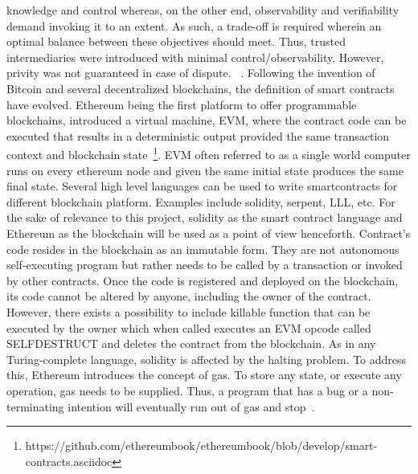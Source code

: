 knowledge and control whereas, on the other end, observability and
verifiability demand invoking it to an extent. As such, a trade-off is
required wherein an optimal balance between these objectives should meet. Thus,
trusted intermediaries were introduced with minimal control/observability.
However, privity was not guaranteed in case of dispute. 
~\cite{szabo1997formalizing}.
Following the invention of Bitcoin and several decentralized blockchains, the
definition of smart contracts have evolved. Ethereum being the first platform
to offer programmable blockchains, introduced a virtual machine, EVM, where the
contract code can be executed that results in a deterministic output provided
the same transaction context and blockchain
state~\footnote{https://github.com/ethereumbook/ethereumbook/blob/develop/smart-contracts.asciidoc}.
EVM often referred to as a single world computer runs on every ethereum node
and given the same initial state produces the same final state. Several high
level languages can be used to write smartcontracts for different blockchain
platform. Examples include solidity, serpent, LLL, etc.  For the sake of
relevance to this project, solidity as the smart contract language and Ethereum
as the blockchain will be used as a point of view henceforth. Contract's code
resides in the blockchain as an immutable form.  They are not autonomous
self-executing program but rather needs to be called by a transaction or
invoked by other contracts. Once the code is registered and deployed on the
blockchain, its code cannot be altered by anyone, including the owner of the
contract. However, there exists a possibility to include killable function that
can be executed by the owner which when called executes an EVM opcode called
SELFDESTRUCT and deletes the contract from the blockchain.  As in any
Turing-complete language, solidity is affected by the halting problem.  To
address this, Ethereum introduces the concept of gas. To store any state, or
execute any operation, gas needs to be supplied. Thus, a program that has a bug
or a non-terminating intention will eventually run out of gas and
stop~\cite{whataresmartcontracts}.





